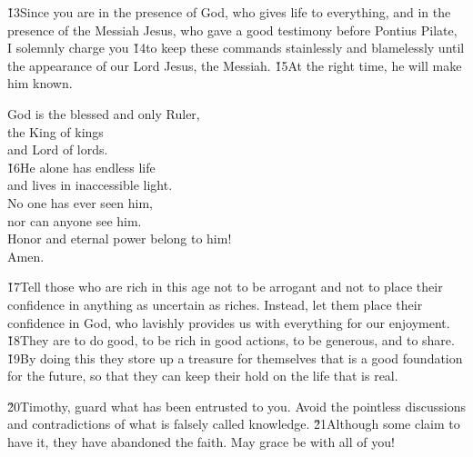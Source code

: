 \v{13}Since you are in the presence of God, who gives life to everything, and in the presence of the Messiah Jesus, who gave a good testimony before Pontius Pilate, I solemnly charge you \v{14}to keep these commands stainlessly and blamelessly until the appearance of our Lord Jesus, the Messiah. \v{15}At the right time, he will make him known.

\begin{poetry}
\poeml God is the blessed and only Ruler, \\
\poemll    the King of kings \\
\poemlll       and Lord of lords. \\
\poeml \v{16}He alone has endless life \\
\poemll    and lives in inaccessible light. \\
\poeml No one has ever seen him, \\
\poemll    nor can anyone see him. \\
\poeml Honor and eternal power belong to him! \\
\poemll    Amen.
\end{poetry}

\v{17}Tell those who are rich in this age not to be arrogant and not to place their confidence in anything as uncertain as riches. Instead, let them place their confidence in God, who lavishly provides us with everything for our enjoyment. \v{18}They are to do good, to be rich in good actions, to be generous, and to share. \v{19}By doing this they store up a treasure for themselves that is a good foundation for the future, so that they can keep their hold on the life that is real.

\v{20}Timothy, guard what has been entrusted to you. Avoid the pointless discussions and contradictions of what is falsely called knowledge. \v{21}Although some claim to have it, they have abandoned the faith. May grace be with all of you!
